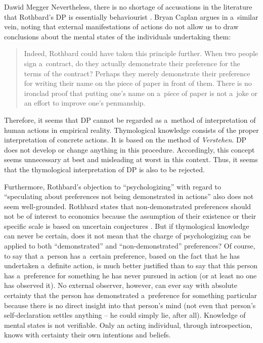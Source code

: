 \begin{artengenv}{Dawid Megger}
Nevertheless, there is no shortage of accusations in the literature that Rothbard's DP is essentially behaviourist 
\parencite[e.g.,][p.574]{prychitko_formalism_1993}. %
 Bryan Caplan argues in a~similar vein, noting that external manifestations of actions do not allow us to draw conclusions about the mental states of the individuals undertaking them:
\begin{quote}
Indeed, Rothbard could have taken this principle further. When two people sign a~contract, do they actually demonstrate their preference for the terms of the contract? Perhaps they merely demonstrate their preference for writing their name on the piece of paper in front of them. There is no ironclad proof that putting one's name on a~piece of paper is not a~joke or an effort to improve one's penmanship. 
\parencite[][p.833]{caplan_austrian_1999}%
\end{quote}
Therefore, it seems that DP cannot be regarded as a~method of interpretation of human actions in empirical reality. Thymological knowledge consists of the proper interpretation of concrete actions. It is based on the method of \textit{Verstehen}. DP does not develop or change anything in this procedure. Accordingly, this concept seems unnecessary at best and misleading at worst in this context. Thus, it seems that the thymological interpretation of DP is also to be rejected.



Furthermore, Rothbard's objection to ``psychologizing'' with regard to ``speculating about preferences not being demonstrated in actions'' also does not seem well-grounded. Rothbard states that non-demonstrated preferences should not be of interest to economics because the assumption of their existence or their specific scale is based on uncertain conjectures 
\parencite[][pp.296–298]{rothbard_present_2011}. %
 But if thymological knowledge can never be certain, does it not mean that the charge of psychologizing can be applied to both ``demonstrated'' and ``non-demonstrated'' preferences? Of course, to say that a~person has a~certain preference, based on the fact that he has undertaken a~definite action, is much better justified than to say that this person has a~preference for something he has never pursued in action (or at least no one has observed it). No external observer, however, can ever say with absolute certainty that the person has demonstrated a~preference for something particular because there is no direct insight into that person's mind (not even that person's self-declaration settles anything -- he could simply lie, after all). Knowledge of mental states is not verifiable. Only an acting individual, through introspection, knows with certainty their own intentions and beliefs.




\end{artengenv}
